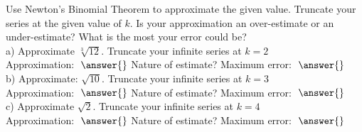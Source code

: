 \documentclass[handout]{ximera}
\begin{document}
\begin{problem} Use Newton's Binomial Theorem to approximate the given value. Truncate your series at the given value of $k$.
 Is your approximation an over-estimate or an under-estimate? What is the most your error could be?\\
a) Approximate $\sqrt[3]{12}$. Truncate your infinite series at $k = 2$ \\
Approximation: $\; \answer{}$ Nature of estimate? 
  Maximum error: $\; \answer{}$\\
b) Approximate: $\sqrt{10}$. Truncate your infinite series at $k = 3$ \\ 
Approximation: $\; \answer{}$ Nature of estimate? 
Maximum error: $\; \answer{}$\\
c) Approximate $\sqrt{2}$. Truncate your infinite series at $k = 4$ \\ Approximation: $\; \answer{}$ Nature of estimate? 
Maximum error: $\; \answer{}$\\


\end{problem}
\end{document}
